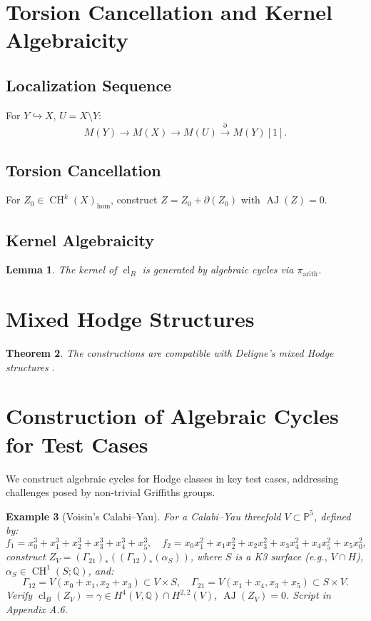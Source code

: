 \documentclass[11pt]{article}
\newtheorem{theorem}{Theorem}[section]
\newtheorem{lemma}[theorem]{Lemma}
\newtheorem{example}[theorem]{Example}
\DeclareMathOperator{\cl}{cl}
\DeclareMathOperator{\CH}{CH}
\DeclareMathOperator{\AJ}{AJ}
\begin{document}
\section{Torsion Cancellation and Kernel Algebraicity}
\subsection{Localization Sequence}
For \( Y \hookrightarrow X \), \( U = X \setminus Y \):
\[
M(Y) \to M(X) \to M(U) \xrightarrow{\partial} M(Y)[1].
\]

\subsection{Torsion Cancellation}
For \( Z_0 \in \CH^k(X)_{\hom} \), construct \( Z = Z_0 + \partial(Z_0) \) with \(\AJ(Z) = 0\).

\subsection{Kernel Algebraicity}
\begin{lemma}\label{lem:kernel-alg}
The kernel of \(\cl_B\) is generated by algebraic cycles via \(\pi_{\mathrm{arith}}\).
\end{lemma}

\section{Mixed Hodge Structures}
\begin{theorem}
The constructions are compatible with Deligne’s mixed Hodge structures \cite{deligne1971}.
\end{theorem}

\section{Construction of Algebraic Cycles for Test Cases}
We construct algebraic cycles for Hodge classes in key test cases, addressing challenges posed by non-trivial Griffiths groups.

\begin{example}[Voisin’s Calabi–Yau]\label{ex:voisin}
For a Calabi–Yau threefold \( V \subset \mathbb{P}^5 \), defined by:
\[
f_1 = x_0^3 + x_1^3 + x_2^3 + x_3^3 + x_4^3 + x_5^3, \quad f_2 = x_0 x_1^2 + x_1 x_2^2 + x_2 x_3^2 + x_3 x_4^2 + x_4 x_5^2 + x_5 x_0^2,
\]
construct \( Z_V = (\Gamma_{21})_* ((\Gamma_{12})_*(\alpha_S)) \), where \( S \) is a K3 surface (e.g., \( V \cap H \)), \(\alpha_S \in \CH^1(S; \mathbb{Q})\), and:
\[
\Gamma_{12} = V(x_0 + x_1, x_2 + x_3) \subset V \times S, \quad \Gamma_{21} = V(x_1 + x_4, x_3 + x_5) \subset S \times V.
\]
Verify \(\cl_B(Z_V) = \gamma \in H^4(V, \mathbb{Q}) \cap H^{2,2}(V)\), \(\AJ(Z_V) = 0\). Script in Appendix A.6.
\end{example}
\end{document}
